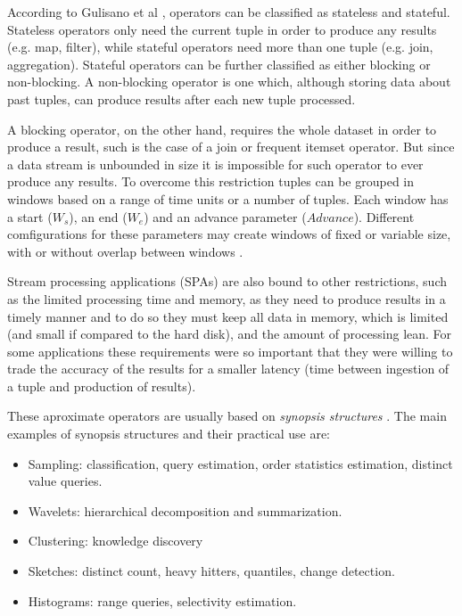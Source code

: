 \documentclass[ppgc,diss,english]{iiufrgs}
\begin{document}
According to Gulisano et al \cite{gulisano2010streamcloud}, operators can be classified as stateless and stateful. Stateless operators only need the current tuple in order to produce any results (e.g. map, filter), while stateful operators need more than one tuple (e.g. join, aggregation). Stateful operators can be further classified as either blocking or non-blocking. A non-blocking operator is one which, although storing data about past tuples, can produce results after each new tuple processed.

A blocking operator, on the other hand, requires the whole dataset in order to produce a result, such is the case of a join or frequent itemset operator. But since a data stream is unbounded in size it is impossible for such operator to ever produce any results. To overcome this restriction tuples can be grouped in windows based on a range of time units or a number of tuples. Each window has a start ($W_s$), an end ($W_e$) and an advance parameter ($Advance$). Different comfigurations for these parameters may create windows of fixed or variable size, with or without overlap between windows \cite{gulisano2012streamcloud}.

Stream processing applications (SPAs) are also bound to other restrictions, such as the limited processing time and memory, as they need to produce results in a timely manner and to do so they must keep all data in memory, which is limited (and small if compared to the hard disk), and the amount of processing lean. For some applications these requirements were so important that they were willing to trade the accuracy of the results for a smaller latency (time between ingestion of a tuple and production of results).

These aproximate operators are usually based on \emph{synopsis structures} \cite{aggarwal2007survey}. The main examples of synopsis structures and their practical use are:

\begin{itemize}
\item Sampling: classification, query estimation, order statistics estimation, distinct value queries.
\item Wavelets: hierarchical decomposition and summarization.
\item Clustering: knowledge discovery
\item Sketches: distinct count, heavy hitters, quantiles, change detection.
\item Histograms: range queries, selectivity estimation.
\end{itemize}
\end{document}
